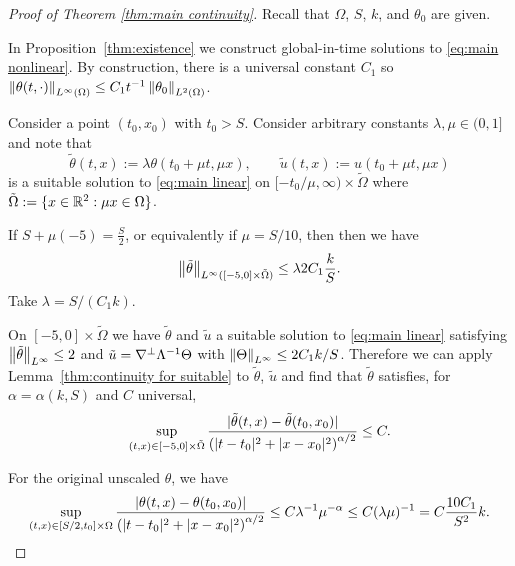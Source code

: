 \begin{proof}[Proof of Theorem \ref{thm:main continuity}]
Recall that $\Omega$, $S$, $k$, and $\theta_0$ are given.  

In Proposition~\ref{thm:existence} we construct global-in-time solutions to \eqref{eq:main nonlinear}.  By construction, there is a universal constant $C_1$ so $\left\lVert\theta(t,\cdot)\right\rVert_{L^\infty(\Omega)} \leq C_1 t^{-1} \left\lVert\theta_0\right\rVert_{L^2(\Omega)}$.  

Consider a point $(t_0, x_0)$ with $t_0 > S$.  Consider arbitrary constants $\lambda, \mu \in (0,1]$ and note that
\[ \tilde{\theta}(t,x) := \lambda \theta(t_0 + \mu t, \mu x), \qquad \tilde{u}(t,x) := u(t_0 + \mu t, \mu x) \]
is a suitable solution to \eqref{eq:main linear} on $[-t_0/\mu,\infty) \times \tilde{\Omega}$ where $\tilde{\Omega} := \{x\in \mathbb{R}^2: \mu x \in \Omega \}$.  

If $S + \mu (-5) = \frac{S}{2}$, or equivalently if $\mu = S/10$, then then we have 
\[ \left\lVert\tilde{\theta}\right\rVert_{L^\infty([-5,0]\times\tilde{\Omega})} \leq \lambda 2 C_1 \frac{k}{S}. \]
Take $\lambda = S / (C_1 k)$.

On $[-5,0]\times\tilde{\Omega}$ we have $\tilde{\theta}$ and $\tilde{u}$ a suitable solution to \eqref{eq:main linear} satisfying $\left\lVert\tilde{\theta}\right\rVert_{L^\infty} \leq 2$ and $\tilde{u} = \nabla^\perp \Lambda^{-1} \Theta$ with $\left\lVert\Theta\right\rVert_{L^\infty} \leq 2 C_1 k/S$.  Therefore we can apply Lemma~\ref{thm:continuity for suitable} to $\tilde{\theta}$, $\tilde{u}$ and find that $\tilde{\theta}$ satisfies, for $\alpha = \alpha(k,S)$ and $C$ universal,
\[ \sup_{(t,x) \in [-5,0]\times\tilde{\Omega}} \frac{|\tilde{\theta}(t,x) - \tilde{\theta}(t_0,x_0)|}{\left( |t-t_0|^2 + |x-x_0|^2 \right)^{\alpha/2}} \leq C. \]


For the original unscaled $\theta$, we have
\[ \sup_{(t,x) \in [S/2,t_0]\times\Omega} \frac{|\theta(t,x) - \theta(t_0,x_0)|}{\left( |t-t_0|^2 + |x-x_0|^2 \right)^{\alpha/2}} \leq C \lambda^{-1} \mu^{-\alpha} \leq C (\lambda\mu)^{-1} = C \frac{10 C_1}{S^2} k. \]

\end{proof}


\vskip1cm



